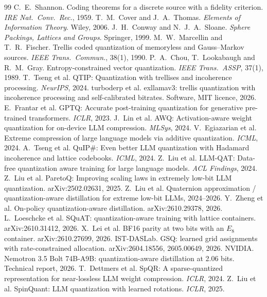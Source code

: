 \documentclass[11pt,a4paper]{article}
\begin{document}
\begin{thebibliography}{99}\small
{} C.~E.~Shannon. Coding theorems for a discrete source with a fidelity
criterion. \emph{IRE Nat.\ Conv.\ Rec.}, 1959.
 T.~M.~Cover and J.~A.~Thomas. \emph{Elements of Information Theory}. Wiley, 2006.
 J.~H.~Conway and N.~J.~A.~Sloane. \emph{Sphere Packings, Lattices and Groups}.
Springer, 1999.
 M.~W.~Marcellin and T.~R.~Fischer. Trellis coded quantization of memoryless
and Gauss--Markov sources. \emph{IEEE Trans.\ Commun.}, 38(1), 1990.
 P.~A.~Chou, T.~Lookabaugh and R.~M.~Gray. Entropy-constrained vector quantization.
\emph{IEEE Trans.\ ASSP}, 37(1), 1989.
 T.~Tseng et al. QTIP: Quantization with trellises and incoherence processing.
\emph{NeurIPS}, 2024.
 turboderp et al. exllamav3: trellis quantization with incoherence processing and
self-calibrated bitrates. Software, MIT licence, 2026.
 E.~Frantar et al. GPTQ: Accurate post-training quantization for generative
pre-trained transformers. \emph{ICLR}, 2023.
 J.~Lin et al. AWQ: Activation-aware weight quantization for on-device LLM
compression. \emph{MLSys}, 2024.
 V.~Egiazarian et al. Extreme compression of large language models via additive
quantization. \emph{ICML}, 2024.
 A.~Tseng et al. QuIP\#: Even better LLM quantization with Hadamard
incoherence and lattice codebooks. \emph{ICML}, 2024.
 Z.~Liu et al. LLM-QAT: Data-free quantization aware training for large language
models. \emph{ACL Findings}, 2024.
 Z.~Liu et al. ParetoQ: Improving scaling laws in extremely low-bit LLM
quantization. arXiv:2502.02631, 2025.
 Z.~Liu et al. Quaternion approximation / quantization-aware distillation for
extreme low-bit LLMs, 2024--2026.
 Y.~Zheng et al. On-policy quantization-aware distillation. arXiv:2610.29378, 2026.
 L.~Loeschcke et al. SQuAT: quantization-aware training with lattice containers.
arXiv:2610.31412, 2026.
 X.~Lei et al. BF16 parity at two bits with an $E_8$ container.
arXiv:2610.27699, 2026.
 IST-DASLab. GSQ: learned grid assignments with rate-constrained allocation.
arXiv:2604.18556, 2605.00649, 2026.
 NVIDIA. Nemotron 3.5 Bolt 74B-A9B: quantization-aware distillation at 2.06 bits.
Technical report, 2026.
 T.~Dettmers et al. SpQR: A sparse-quantized representation for near-lossless LLM
weight compression. \emph{ICLR}, 2024.
 Z.~Liu et al. SpinQuant: LLM quantization with learned rotations.
\emph{ICLR}, 2025.
\end{thebibliography}
\end{document}
